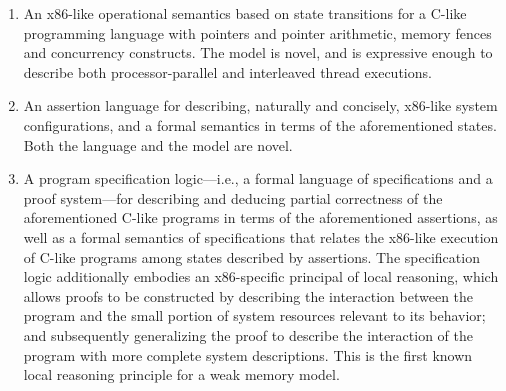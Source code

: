 \documentclass[11pt]{report}         %
\begin{document}
\begin{enumerate}
  \item An x86-like operational semantics based on state transitions for a C-like programming language with pointers and pointer arithmetic, memory fences and concurrency constructs. The model is novel, and is expressive enough to describe both processor-parallel and interleaved thread executions. 

  \item An assertion language for describing, naturally and concisely, x86-like system configurations, and a formal semantics in terms of the aforementioned states. Both the language and the model are novel. 

  \item A program specification logic---i.e., a formal language of specifications and a proof system---for describing and deducing partial correctness of the aforementioned C-like programs in terms of the aforementioned assertions, as well as a formal semantics of specifications that relates the x86-like execution of C-like programs among states described by assertions. The specification logic additionally embodies an x86-specific principal of local reasoning, which allows proofs to be constructed by describing the interaction between the program and the small portion of system resources relevant to its behavior; and subsequently generalizing the proof to describe the interaction of the program with more complete system descriptions. This is the first known local reasoning principle for a weak memory model. 
\end{enumerate}
\end{document}
